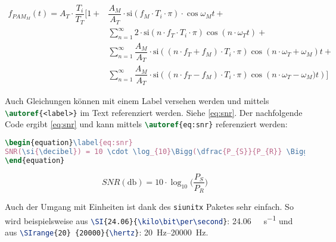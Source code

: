 \begin{equation}\label{eq:pam}
\begin{split}
f_{PAM_{M}}(t) = A_{T}\cdot \dfrac{T_{i}}{T_{T}} \Bigg[ 1+& \dfrac{A_{M}}{A_{T}}\cdot \mathrm{si}\left(f_{M}\cdot T_{i}\cdot \pi \right) \cdot \cos{\omega_{M}t} + \\
& \sum _{n=1}^{\infty }2\cdot \mathrm{si}\left(n\cdot f_{T}\cdot T_{i} \cdot \pi \right)\cos{\left(n\cdot \omega_{T} t \right)}  +  \\
& \sum _{n=1}^{\infty } \dfrac{A_{M}}{A_{T}} \cdot \mathrm{si}\left((n\cdot f_{T} + f_{M}) \cdot T_{i} \cdot \pi \right)\cos{\left(n\cdot \omega_{T} + \omega_{M}\right)}t +  \\
& \sum _{n=1}^{\infty } \dfrac{A_{M}}{A_{T}} \cdot \mathrm{si}\left((n\cdot f_{T} - f_{M})\cdot T_{i} \cdot \pi \right)\cos{\left(n\cdot \omega_{T} - \omega_{M})t\right)} \Bigg]
\end{split}
\end{equation}

Auch Gleichungen können mit einem Label versehen werden und mittels \lstinline[language=latex]|\autoref{<label>}| im Text referenziert werden. Siehe \autoref{eq:snr}. Der nachfolgende Code ergibt \autoref{eq:snr} und kann mittels \lstinline[language=latex]|\autoref{eq:snr}| referenziert werden:

\begin{lstlisting}[language=latex,breaklines]
\begin{equation}\label{eq:snr}
SNR(\si{\decibel}) = 10 \cdot \log_{10}\Bigg(\dfrac{P_{S}}{P_{R}} \Bigg)
\end{equation}
\end{lstlisting}

\begin{equation}\label{eq:snr}
	SNR(\si{\decibel}) = 10 \cdot \log_{10}\Bigg(\dfrac{P_{S}}{P_{R}} \Bigg)
\end{equation}

Auch der Umgang mit Einheiten ist dank des \texttt{siunitx} Paketes sehr einfach. So wird beispielsweise aus \lstinline[language=latex]|\SI{24.06}{\kilo\bit\per\second}|: \SI{24.06}{\kilo\bit\per\second} und aus \lstinline[language=latex]|\SIrange{20} {20000}{\hertz}|: \SIrange{20}{20000}{\hertz}.